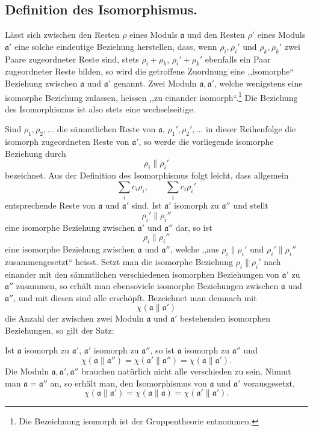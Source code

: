 \subsection*{Definition des Isomorphismus.}

Lässt sich zwischen den Resten $\rho$ eines Moduls $\mathfrak a$ und den Resten $\rho'$ eines Moduls $\mathfrak a'$ eine solche eindeutige Beziehung herstellen, dass, wenn $\rho_i,\rho_i'$ und $\rho_k,\rho_k'$ zwei Paare zugeordneter Reste sind, stets $\rho_i+\rho_k$, $\rho_i'+\rho_k'$ ebenfalls ein Paar zugeordneter Reste bilden, so wird die getroffene Zuordnung eine ,,isomorphe`` Beziehung zwischen $\mathfrak a$ und $\mathfrak a'$ genannt. Zwei Moduln $\mathfrak a,\mathfrak a'$, welche wenigstens eine isomorphe Beziehung zulassen, heissen ,,zu einander isomorph``.\footnote{Die Bezeichnung isomorph ist der Gruppentheorie entnommen.} Die Beziehung des Isomorphismus ist also stets eine wechselseitige.

Sind $\rho_1,\rho_2,\ldots$ die sämmtlichen Reste von $\mathfrak a$, $\rho_1',\rho_2',\ldots$ in dieser Reihenfolge die isomorph zugeordneten Reste von $\mathfrak a'$, so werde die vorliegende isomorphe Beziehung durch
\[
 \rho_i\parallel \rho_i'
\]
bezeichnet. Aus der Definition des Isomorphismus folgt leicht, dass allgemein
\[
 \sum_i c_i\rho_i,
 \qquad
 \sum_i c_i\rho_i'
\]
entsprechende Reste von $\mathfrak a$ und $\mathfrak a'$ sind. Ist $\mathfrak a'$ isomorph zu $\mathfrak a''$ und stellt
\[
 \rho_i'\parallel \rho_i''
\]
eine isomorphe Beziehung zwischen $\mathfrak a'$ und $\mathfrak a''$ dar, so ist
\[
 \rho_i\parallel \rho_i''
\]
eine isomorphe Beziehung zwischen $\mathfrak a$ und $\mathfrak a''$, welche ,,aus $\rho_i\parallel\rho_i'$ und $\rho_i'\parallel\rho_i''$ zusammengesetzt`` heisst. Setzt man die isomorphe Beziehung $\rho_i\parallel\rho_i'$ nach einander mit den sämmtlichen verschiedenen isomorphen Beziehungen von $\mathfrak a'$ zu $\mathfrak a''$ zusammen, so erhält man ebensoviele isomorphe Beziehungen zwischen $\mathfrak a$ und $\mathfrak a''$, und mit diesen sind alle erschöpft. Bezeichnet man demnach mit
\[
 \chi(\mathfrak a\parallel\mathfrak a')
\]
die Anzahl der zwischen zwei Moduln $\mathfrak a$ und $\mathfrak a'$ bestehenden isomorphen Beziehungen, so gilt der Satz:

Ist $\mathfrak a$ isomorph zu $\mathfrak a'$, $\mathfrak a'$ isomorph zu $\mathfrak a''$, so ist $\mathfrak a$ isomorph zu $\mathfrak a''$ und
\[
 \chi(\mathfrak a\parallel\mathfrak a'')=
 \chi(\mathfrak a'\parallel\mathfrak a'')=
 \chi(\mathfrak a\parallel\mathfrak a').
\]
Die Moduln $\mathfrak a,\mathfrak a',\mathfrak a''$ brauchen natürlich nicht alle verschieden zu sein. Nimmt man $\mathfrak a=\mathfrak a''$ an, so erhält man, den Isomorphismus von $\mathfrak a$ und $\mathfrak a'$ vorausgesetzt,
\[
 \chi(\mathfrak a\parallel\mathfrak a')=
 \chi(\mathfrak a\parallel\mathfrak a)=
 \chi(\mathfrak a'\parallel\mathfrak a').
\]

